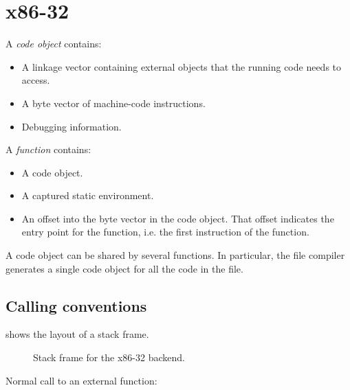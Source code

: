 \chapter{x86-32}
\label{chap-backend-x86}

A \emph{code object} contains:

\begin{itemize}
\item A linkage vector containing external objects that the running
  code needs to access.
\item A byte vector of machine-code instructions.  
\item Debugging information.
\end{itemize}

A \emph{function} contains:

\begin{itemize}
\item A code object.
\item A captured static environment. 
\item An offset into the byte vector in the code object.  That offset
  indicates the entry point for the function, i.e. the first
  instruction of the function. 
\end{itemize}

A code object can be shared by several functions.  In particular, the
file compiler generates a single code object for all the code in the
file. 

\section{Calling conventions}

 shows the layout of a stack frame. 

\begin{figure}
\begin{center}
\end{center}
\caption{\label{fig-x86-32-stack-frame}
Stack frame for the x86-32 backend.}
\end{figure}

Normal call to an external function:

